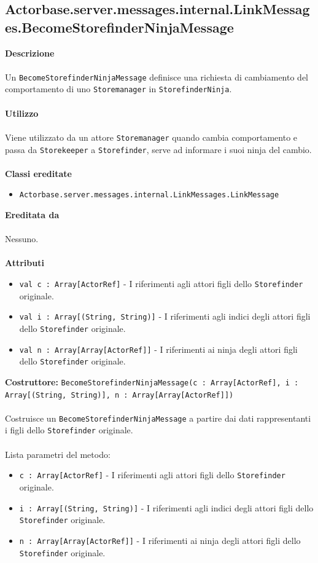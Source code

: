 \documentclass[a4paper]{article}
\begin{document}
	\subsection{Actorbase.server.messages.internal.LinkMessages.BecomeStorefinderNinjaMessage}
		\textbf{Descrizione}
			\\ \\
			Un \texttt{BecomeStorefinderNinjaMessage} definisce una richiesta di cambiamento del comportamento di uno \texttt{Storemanager} in \texttt{StorefinderNinja}.
			\\ \\
		\textbf{Utilizzo}
			\\ \\
			Viene utilizzato da un attore \texttt{Storemanager} quando cambia comportamento e passa da \texttt{Storekeeper} a \texttt{Storefinder}, serve ad informare i suoi ninja del cambio.
			\\ \\
		\textbf{Classi ereditate}
			\begin{itemize}
				\item \texttt{Actorbase.server.messages.internal.LinkMessages.LinkMessage}
			\end{itemize}
		\textbf{Ereditata da}
			\\ \\
			Nessuno.
			\\ \\
		\textbf{Attributi}
			\begin{itemize}
				\item \texttt{val c : Array[ActorRef]} - I riferimenti agli attori figli dello \texttt{Storefinder} originale.
				\item \texttt{val i : Array[(String, String)]} - I riferimenti agli indici degli attori figli dello \texttt{Storefinder} originale.
				\item \texttt{val n : Array[Array[ActorRef]]} - I riferimenti ai ninja degli attori figli dello \texttt{Storefinder} originale.
			\end{itemize}
		\textbf{Costruttore:} \texttt{BecomeStorefinderNinjaMessage(c : Array[ActorRef], i : Array[(String, String)], n : Array[Array[ActorRef]])}
		\\ \\
		Costruisce un \texttt{BecomeStorefinderNinjaMessage} a partire dai dati rappresentanti i figli dello \texttt{Storefinder} originale.
		\\ \\
		Lista parametri del metodo:
			\begin{itemize}
				\item \texttt{c : Array[ActorRef]} - I riferimenti agli attori figli dello \texttt{Storefinder} originale.
				\item \texttt{i : Array[(String, String)]} - I riferimenti agli indici degli attori figli dello \texttt{Storefinder} originale.
				\item \texttt{n : Array[Array[ActorRef]]} - I riferimenti ai ninja degli attori figli dello \texttt{Storefinder} originale.
			\end{itemize}
			
\end{document}
